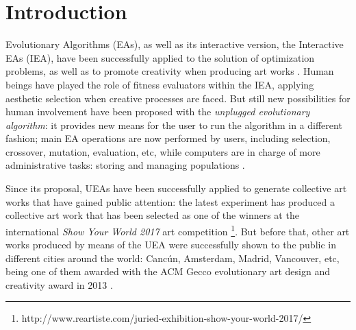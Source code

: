 \documentclass[graybox]{svmult}
\begin{document}

\section{Introduction}
Evolutionary Algorithms (EAs), as well as its interactive version, the
Interactive EAs (IEA), have been successfully applied to the solution
of optimization problems, as well as to promote creativity when
producing art works \cite{takagi2001interactive}.  Human beings have
played the role of fitness evaluators within the IEA, applying
aesthetic selection when creative processes are faced.  But still new
possibilities for human involvement have been proposed with the
\textit{unplugged evolutionary algorithm}:  it provides new means for
the user to run the algorithm in a different fashion;  main EA
operations are now performed by users, including selection, crossover,
mutation, evaluation, etc, while computers are in charge of more
administrative tasks:  storing and managing populations
\cite{de2014unplugging}. 
  
Since its proposal, UEAs have been successfully applied to generate
collective art works %
that have gained public attention:  the latest experiment has produced
a collective art work that has been selected as one of the winners at
the international \textit{Show Your World 2017} art competition
\footnote{http://www.reartiste.com/juried-exhibition-show-your-world-2017/}.
But before that, other art works produced by means of the UEA were
successfully shown to the public in different cities around the world:
Cancún, Amsterdam, Madrid, Vancouver, etc, being one of them awarded
with the ACM Gecco evolutionary art design and creativity award in
2013 \cite{loiacono2014gecco}. 
\end{document}
